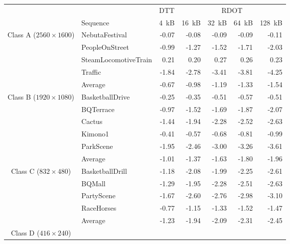 \documentclass[11pt,a4paper,openright,twoside]{book}
\numberwithin{equation}{section} %
\numberwithin{figure}{section} %
\numberwithin{table}{section} %
\begin{document}
\begin{table}[tb]
	\centering
	\small
	\begin{tabularx}{\textwidth}{c|X|r|rrrr}
		\multicolumn{2}{c}{} &
		\multicolumn{1}{c|}{\acs{DTT}} &
		\multicolumn{4}{c}{\acs{RDOT}} \\
		\cline{2-7}
		\multicolumn{1}{c}{} & {Sequence} &
		\SI{4}{\kilo B} &
		\SI{16}{\kilo B} &
		\SI{32}{\kilo B} &
		\SI{64}{\kilo B} &
		\SI{128}{\kilo B} \\
		\hline
		\hline
		\multirow{5}{2cm}{\centering Class A ($2560\times1600$)}
		& NebutaFestival         & -0.07 & -0.08 & -0.09 & -0.09 & -0.11 \\
		& PeopleOnStreet         & -0.99 & -1.27 & -1.52 & -1.71 & -2.03 \\
		& SteamLocomotiveTrain   &  0.21 &  0.20 & 0.27  & 0.26  &  0.23 \\
		& Traffic                & -1.84 & -2.78 & -3.41 & -3.81 & -4.25 \\
		\cline{2-7} &
		Average                  & -0.67 & -0.98 & -1.19 & -1.33 & -1.54 \\
		\hline
		\hline
		\multirow{6}{2cm}{\centering Class B ($1920\times1080$)}
		& BasketballDrive        & -0.25 & -0.35 & -0.51 & -0.57 & -0.51 \\
		& BQTerrace              & -0.97 & -1.52 & -1.69 & -1.87 & -2.07 \\
		& Cactus                 & -1.44 & -1.94 & -2.28 & -2.52 & -2.63 \\
		& Kimono1                & -0.41 & -0.57 & -0.68 & -0.81 & -0.99 \\
		& ParkScene              & -1.95 & -2.46 & -3.00 & -3.26 & -3.61 \\
		\cline{2-7} &
		Average                  & -1.01 & -1.37 & -1.63 & -1.80 & -1.96 \\
		\hline
		\hline
		\multirow{5}{2cm}{\centering Class C ($832\times480$)}
		& BasketballDrill        & -1.18 & -2.08 & -1.99 & -2.25 & -2.61 \\
		& BQMall                 & -1.29 & -1.95 & -2.28 & -2.51 & -2.63 \\
		& PartyScene             & -1.67 & -2.60 & -2.76 & -2.98 & -3.10 \\
		& RaceHorses             & -0.77 & -1.15 & -1.33 & -1.52 & -1.47 \\
		\cline{2-7} &
		Average                  & -1.23 & -1.94 & -2.09 & -2.31 & -2.45 \\
		\hline
		\hline
		\multirow{5}{2cm}{\centering Class D ($416\times240$)}

\end{tabularx}
\end{table}
\end{document}
